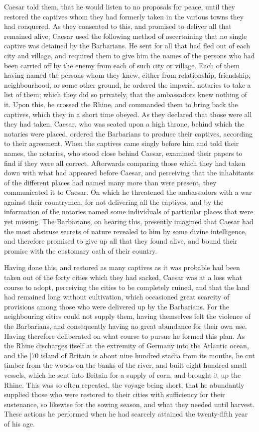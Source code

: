 Caesar told them, that he would listen to no proposals for peace, until they restored the captives whom they had formerly taken in the various towns they had conquered. As they consented to this, and promised to deliver all that remained alive; Caesar used the following method of ascertaining that no single captive was detained by the Barbarians. He sent for all that had fled out of each city and village, and required them to give him the names of the persons who had been carried off by the enemy from each of such city or village. Each of them having named the persons whom they knew, either from relationship, friendship, neighbourhood, or some other ground, he ordered the imperial notaries to take a list of them; which they did so privately, that the ambassadors knew nothing of it. Upon this, he crossed the Rhine, and commanded them to bring back the captives, which they in a short time obeyed. As they declared that those were all they had taken, Caesar, who was seated upon a high throne, behind which the notaries were placed, ordered the Barbarians to produce their captives, according to their agreement. When the captives came singly before him and told their names, the notaries, who stood close behind Caesar, examined their papers to find if they were all correct. Afterwards comparing those which they had taken down with what had appeared before Caesar, and perceiving that the inhabitants of the different places had named many more than were present, they communicated it to Caesar. On which he threatened the ambassadors with a war against their countrymen, for not delivering all the captives, and by the information of the notaries named some individuals of particular places that were yet missing. The Barbarians, on hearing this, presently imagined that Caesar had the most abstruse secrets of nature revealed to him by some divine intelligence, and therefore promised to give up all that they found alive, and bound their promise with the customary oath of their country.

Having done this, and restored as many captives as it was probable had been taken out of the forty cities which they had sacked, Caesar was at a loss what course to adopt, perceiving the cities to be completely ruined, and that the land had remained long without cultivation, which occasioned great scarcity of provisions among those who were delivered up by the Barbarians. For the neighbouring cities could not supply them, having themselves felt the violence of the Barbarians, and consequently having no great abundance for their own use. Having therefore deliberated on what course to pursue he formed this plan. As the Rhine discharges itself at the extremity of Germany into the Atlantic ocean, and the
|70 island of Britain is about nine hundred stadia from its mouths, he cut timber from the woods on the banks of the river, and built eight hundred small vessels, which he sent into Britain for a supply of corn, and brought it up the Rhine. This was so often repeated, the voyage being short, that he abundantly supplied those who were restored to their cities with sufficiency for their sustenance, so likewise for the sowing season, and what they needed until harvest. These actions he performed when he had scarcely attained the twenty-fifth year of his age.

